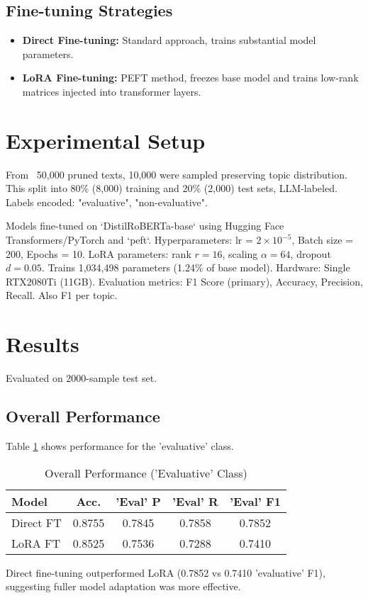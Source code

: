 \documentclass{article}
\begin{document}
\subsection{Fine-tuning Strategies}
\label{sec:methodology:finetuning}
\begin{itemize}[leftmargin=*, noitemsep, topsep=0pt]
\item \textbf{Direct Fine-tuning:} Standard approach, trains substantial model parameters.
\item \textbf{LoRA Fine-tuning:} PEFT method, freezes base model and trains low-rank matrices injected into transformer layers.
\end{itemize}

\section{Experimental Setup}
\label{sec:experimental_setup}
From ~50,000 pruned texts, 10,000 were sampled preserving topic distribution. This split into 80\% (8,000) training and 20\% (2,000) test sets, LLM-labeled. Labels encoded: "evaluative", "non-evaluative".

Models fine-tuned on `DistilRoBERTa-base` using Hugging Face Transformers/PyTorch and `peft`.
Hyperparameters: lr = $2 \times 10^{-5}$, Batch size = 200, Epochs = 10.
LoRA parameters: rank $r = 16$, scaling $\alpha = 64$, dropout $d = 0.05$. Trains 1,034,498 parameters (1.24\% of base model).
Hardware: Single RTX2080Ti (11GB).
Evaluation metrics: F1 Score (primary), Accuracy, Precision, Recall. Also F1 per topic.

\section{Results}
\label{sec:results}
Evaluated on 2000-sample test set.

\subsection{Overall Performance}
\label{sec:results:overall}
Table \ref{tab:overall_metrics} shows performance for the 'evaluative' class.

\begin{table}[htbp]
    \centering
    \caption{Overall Performance ('Evaluative' Class)}
    \label{tab:overall_metrics}
    \small %
    \begin{tabular}{l c c c c}
        \toprule
        Model & Acc. & 'Eval' P & 'Eval' R & 'Eval' F1 \\
        \midrule
        Direct FT & 0.8755 & 0.7845 & 0.7858 & 0.7852 \\
        LoRA FT   & 0.8525 & 0.7536 & 0.7288 & 0.7410 \\
        \bottomrule
    \end{tabular}
\end{table}
Direct fine-tuning outperformed LoRA (0.7852 vs 0.7410 'evaluative' F1), suggesting fuller model adaptation was more effective.
\end{document}
